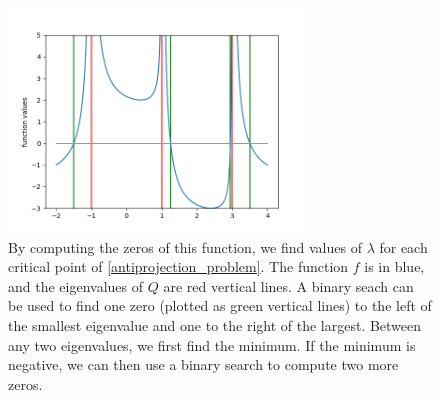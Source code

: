 \begin{figure}[ht]
    \centering
    \includegraphics[width=300px]{images/antiprojection.png}
    \caption[
    		An example plot of the one-dimensional function whose zeros provide the largest ellipsoid within the buffering cones.
		]{
    		By computing the zeros of this function, we find values of $\lambda$ for each critical point of \cref{antiprojection_problem}.
    		The function $f$ is in blue, and the eigenvalues of $Q$ are red vertical lines.
    		A binary seach can be used to find one zero (plotted as green vertical lines) to the left of the smallest eigenvalue and one to the right of the largest.
    		Between any two eigenvalues, we first find the minimum.
    		If the minimum is negative, we can then use a binary search to compute two more zeros.
	}
    \label{antiprojection_image}
\end{figure}





